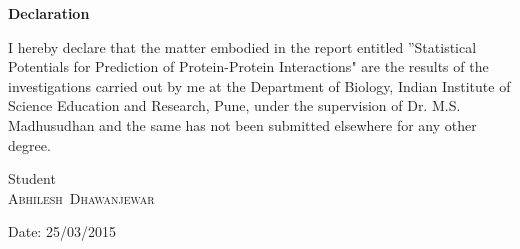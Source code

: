 \begin{titlepage}
\begin{center}
{\huge \bfseries Declaration}\\[2.5cm]
\end{center}
I hereby declare that the matter embodied in the report entitled ''Statistical Potentials for Prediction of Protein-Protein Interactions" are the results of the investigations carried out by me at the Department of Biology, Indian Institute of Science Education and Research, Pune, under the supervision of Dr. M.S. Madhusudhan and the same has not been submitted elsewhere for any other degree.\\[6cm]

\noindent
\begin{minipage}{.5\textwidth}
\begin{flushleft}
Student\\
\textsc{\mbox{Abhilesh Dhawanjewar}}
\end{flushleft}
\end{minipage}
\begin{minipage}{.5\textwidth}
\begin{flushright}
Date: 25/03/2015
\end{flushright}
\end{minipage}

\vfill %
\end{titlepage}
